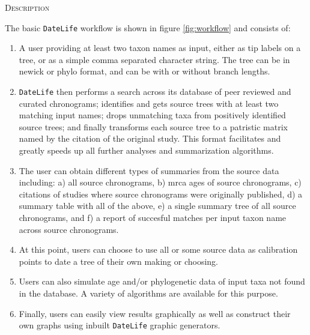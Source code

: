 \documentclass[]{article}
\providecommand{\tightlist}{%
  \setlength{\itemsep}{0pt}\setlength{\parskip}{0pt}}
\begin{document}
\begin{center}
\textsc{Description}
\end{center}

The basic \texttt{DateLife} workflow is shown in figure \ref{fig:workflow} and consists of:

\begin{enumerate}
\def\labelenumi{\arabic{enumi})}
\tightlist
\item
  A user providing at least two taxon names as input, either as tip labels on a tree, or as a simple comma separated character string. The tree can be in newick or phylo format, and can be with or without branch lengths.
\item
  \texttt{DateLife} then performs a search across its database of peer reviewed and curated chronograms; identifies and gets source trees with at least two matching input names; drops unmatching taxa from positively identified source trees; and finally transforms each source tree to a patristic matrix named by the citation of the original study. This format facilitates and greatly speeds up all further analyses and summarization algorithms.
\item
  The user can obtain different types of summaries from the source data including: a) all source chronograms, b) mrca ages of source chronograms, c) citations of studies where source chronograms were originally published, d) a summary table with all of the above, e) a single summary tree of all source chronograms, and f) a report of succesful matches per input taxon name across source chronograms.
\item
  At this point, users can choose to use all or some source data as calibration points to date a tree of their own making or choosing. 
\item
  Users can also simulate age and/or phylogenetic data of input taxa not found in the database. A variety of algorithms are available for this purpose.
\item
  Finally, users can easily view results graphically as well as construct their own graphs using inbuilt \texttt{DateLife} graphic generators.
\end{enumerate}
\end{document}
